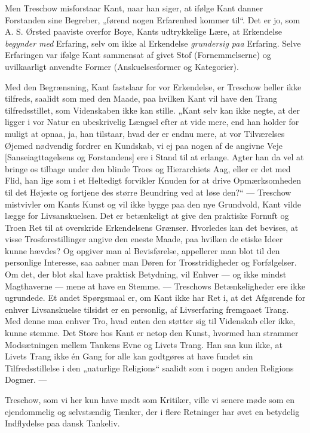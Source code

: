 \documentclass[12pt,a4paper,openany]{book}
\newcommand{\opage}[1]{\marginnote{\footnotesize\textit{[#1]}}}
\begin{document}
Men Treschow misforstaar Kant, naar han siger, at ifølge Kant danner Forstanden
sine Begreber, „førend nogen Erfarenhed kommer til“. Det er jo, som A. S.
Ørsted paaviste overfor Boye, Kants udtrykkelige Lære, at Erkendelse
\textit{begynder med} Erfaring, selv om ikke al Erkendelse
\textit{grunder}\textit{sig paa} Erfaring. Selve Erfaringen var ifølge Kant
sammensat af givet Stof (Fornemmelserne) og uvilkaarligt anvendte Former
(Anskuelsesformer og Kategorier).

Med den Begrænsning, Kant fastslaar for vor Erkendelse, er Treschow heller ikke
tilfreds, saalidt som med den Maade, paa hvilken Kant vil have den Trang
tilfredsstillet, som Videnskaben ikke kan stille. „Kant selv kan ikke negte, at
der ligger i vor Natur en ubeskrivelig Længsel efter at vide mere, end han
holder for muligt at opnaa, ja, han tilstaar, hvad der er endnu mere, at vor
Tilværelses Øjemed nødvendig fordrer en Kundskab, vi ej paa nogen af de angivne
Veje [Sanseiagttagelsens og Forstandens] ere i Stand til at erlange. Agter han
da vel at bringe os tilbage under den blinde Troes og Hierarchiets Aag, eller
er det med Flid, han lige%
\setcounter{footnote}{0}%
\opage{39}som i et Heltedigt forvikler Knuden for at drive Opmærksomheden til
det Højeste og fortjene des større Beundring ved at løse den?“ --- Treschow
mistvivler om Kants Kunst og vil ikke bygge paa den nye Grundvold, Kant vilde
lægge for Livsanskuelsen. Det er betænkeligt at give den praktiske Fornuft og
Troen Ret til at overskride Erkendelsens Grænser. Hvorledes kan det bevises, at
visse Trosforestillinger angive den eneste Maade, paa hvilken de etiske Ideer
kunne hævdes? Og opgiver man al Bevisførelse, appellerer man blot til den
personlige Interesse, saa aabner man Døren for Trosstridigheder og
Forfølgelser. Om det, der blot skal have praktisk Betydning, vil Enhver --- og
ikke mindst Magthaverne --- mene at have en Stemme. --- Treschows
Betænkeligheder ere ikke ugrundede. Et andet Spørgsmaal er, om Kant ikke har
Ret i, at det Afgørende for enhver Livsanskuelse tilsidst er en personlig, af
Livserfaring fremgaaet Trang. Med denne maa enhver Tro, hvad enten den støtter
sig til Videnskab eller ikke, kunne stemme. Det Store hos Kant er netop den
Kunst, hvormed han strammer Modsætningen mellem Tankens Evne og Livets Trang.
Han saa kun ikke, at Livets Trang ikke én Gang for alle kan godtgøres at have
fundet sin Tilfredsstillelse i den „naturlige Religions“ saalidt som i nogen
anden Religions Dogmer. ---

Treschow, som vi her kun have mødt som Kritiker, ville vi senere møde som en
ejendommelig og selvstændig Tænker, der i flere Retninger har øvet en betydelig
Indflydelse paa dansk Tankeliv.
\end{document}
